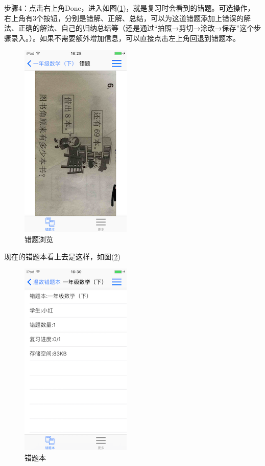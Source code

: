 步骤4：点击右上角Done，进入如图(\ref{img22})，就是复习时会看到的错题。可选操作，右上角有3个按钮，分别是错解、正解、总结，可以为这道错题添加上错误的解法、正确的解法、自己的归纳总结等（还是通过“拍照→剪切→涂改→保存”这个步骤录入。）。如果不需要额外增加信息，可以直接点击左上角回退到错题本。
\begin{figure}[H]
	\centering
	\includegraphics{img/22.png}
	\caption{错题浏览}
	\label{img22}
\end{figure}

现在的错题本看上去是这样，如图(\ref{img23})
\begin{figure}[H]
	\centering
	\includegraphics{img/23.png}
	\caption{错题本}
	\label{img23}
\end{figure}

